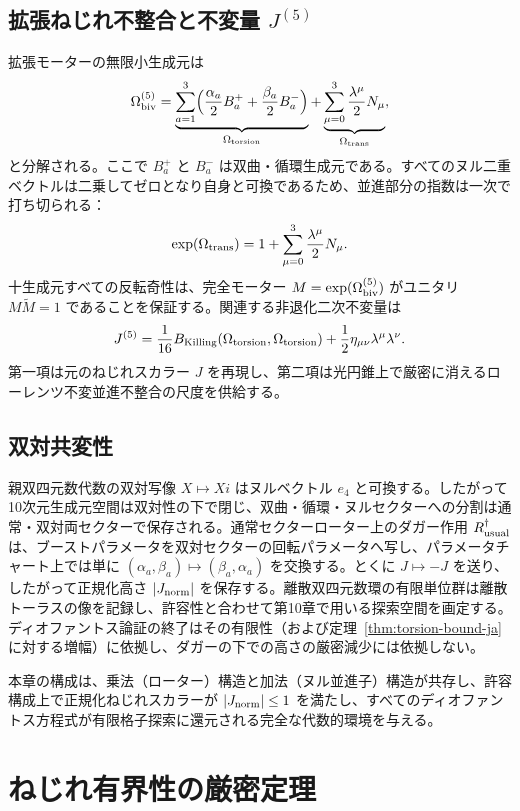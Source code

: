 \documentclass[dvipdfmx,a4paper]{article}
\theoremstyle{definition}
\theoremstyle{remark}
\newcommand{\Jnorm}{J_{\rm norm}}
\begin{document}
\subsection{拡張ねじれ不整合と不変量 \texorpdfstring{$J^{(5)}$}{J5}}

拡張モーターの無限小生成元は
\[
\Omega_{\rm biv}^{(5)} = \underbrace{\sum_{a=1}^3 \Bigl( \frac{\alpha_a}{2} B_a^+ + \frac{\beta_a}{2} B_a^- \Bigr)}_{\Omega_{\rm torsion}} + \underbrace{\sum_{\mu=0}^3 \frac{\lambda^\mu}{2} N_\mu}_{\Omega_{\rm trans}},
\]
と分解される。ここで $B_a^+$ と $B_a^-$ は双曲・循環生成元である。すべてのヌル二重ベクトルは二乗してゼロとなり自身と可換であるため、並進部分の指数は一次で打ち切られる：
\[
\exp(\Omega_{\rm trans}) = 1 + \sum_{\mu=0}^3 \frac{\lambda^\mu}{2} N_\mu.
\]
十生成元すべての反転奇性は、完全モーター $M = \exp(\Omega_{\rm biv}^{(5)})$ がユニタリ $M \widetilde{M} = 1$ であることを保証する。関連する非退化二次不変量は
\[
J^{(5)} = \frac{1}{16} B_{\rm Killing}(\Omega_{\rm torsion}, \Omega_{\rm torsion}) + \frac{1}{2} \eta_{\mu\nu} \lambda^\mu \lambda^\nu.
\]
第一項は元のねじれスカラー $J$ を再現し、第二項は光円錐上で厳密に消えるローレンツ不変並進不整合の尺度を供給する。

\subsection{双対共変性}

親双四元数代数の双対写像 $X \mapsto Xi$ はヌルベクトル $e_4$ と可換する。したがって10次元生成元空間は双対性の下で閉じ、双曲・循環・ヌルセクターへの分割は通常・双対両セクターで保存される。通常セクターローター上のダガー作用 $R_{\rm usual}^\dagger$ は、ブーストパラメータを双対セクターの回転パラメータへ写し、パラメータチャート上では単に $(\alpha_a,\beta_a)\mapsto(\beta_a,\alpha_a)$ を交換する。とくに $J\mapsto -J$ を送り、したがって正規化高さ $|\Jnorm|$ を保存する。離散双四元数環の有限単位群は離散トーラスの像を記録し、許容性と合わせて第10章で用いる探索空間を画定する。ディオファントス論証の終了はその有限性（および定理~\ref{thm:torsion-bound-ja} に対する増幅）に依拠し、ダガーの下での高さの厳密減少には依拠しない。

本章の構成は、乗法（ローター）構造と加法（ヌル並進子）構造が共存し、許容構成上で正規化ねじれスカラーが $|\Jnorm|\leq 1$ を満たし、すべてのディオファントス方程式が有限格子探索に還元される完全な代数的環境を与える。

\section{ねじれ有界性の厳密定理}
\end{document}
